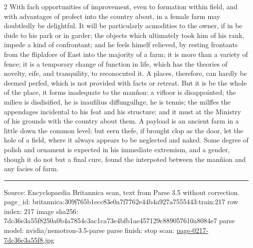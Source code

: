 \documentclass[10pt]{article}
\begin{document}
\begin{multicols}{2}
With fach opportunities of improvement, even to formation within field, and with advantages of profect into the country about, in a female farm may doubtledly be delightful. It will be particularly acmodities to the owner, if in be dude to his park or in garder; the objects which ultimately took him of his rank, impede a kind of confrontant; and he feels himelf relieved, by resting frontants from the fliplafore of East into the majority of a farm; it is more than a variety of fence; it is a temporary change of function in life, which has the theories of novelty, eife, and tranquility, to reconocuted it. A places, therefore, can hardly be deemed perfed, which is not provided with facts or retreat. But it is be the whole of the place, it forms inadequate to the manñon: a vifloor is disappointed; the milieu is disdisified, he is inaufilius diffungulhge, he is tennis; the milffes the appendages incidental to his feat and his structure; and it must at the Ministry of his grounds with the country about them. A payload is an ancient farm in a little down the common level; but eern thefe, if brought clop as the door, let the hole of a field, where it always appears to be neglected and naked. Some degree of polish and ornament is expected in his immediate extremism, and a gender, though it do not but a final cure, found the interpoted between the manñion and any facies of farm.

\end{multicols}
\vfill\par\noindent\rule{\linewidth}{0.4pt}\par
{\scriptsize\color{gray}\noindent Source: Encyclopaedia Britannica scan, text from Parse 3.5 without correction. page\_id: britannica:309f765b1ecc83e0a7f7762e44b4a927a7555443:train:217 \quad row index: 217 \quad image sha256: 7dc36e3a55f8250a0b4a7854c3ac1ca73e4bfb1ae457129c889057610a8084e7 \quad parse model: nvidia/nemotron-3.5-parse \quad parse finish: stop \quad scan: \href{../scans/page-0217-7dc36e3a55f8.jpg}{page-0217-7dc36e3a55f8.jpg}\par}
\end{document}

